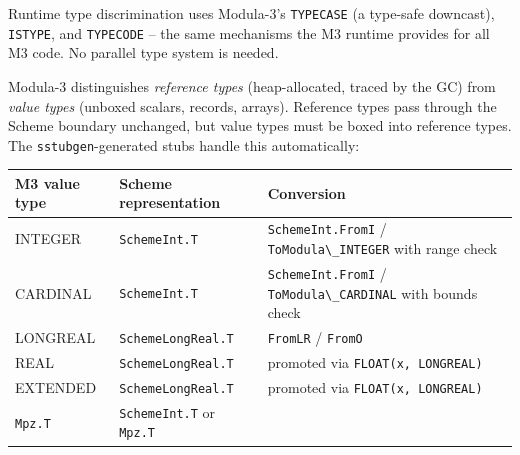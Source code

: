 \documentclass[
  12pt,
]{report}
\newcommand{\passthrough}[1]{#1}
\newcounter{none} %
\begin{document}
Runtime type discrimination uses Modula-3's
\passthrough{\lstinline!TYPECASE!} (a type-safe downcast),
\passthrough{\lstinline!ISTYPE!}, and \passthrough{\lstinline!TYPECODE!}
-- the same mechanisms the M3 runtime provides for all M3 code. No
parallel type system is needed.

Modula-3 distinguishes \emph{reference types} (heap-allocated, traced by
the GC) from \emph{value types} (unboxed scalars, records, arrays).
Reference types pass through the Scheme boundary unchanged, but value
types must be boxed into reference types. The
\passthrough{\lstinline!sstubgen!}-generated stubs handle this
automatically:

{\def\LTcaptype{none} %
\begin{longtable}[]{@{}
  >{\raggedright\arraybackslash}p{}
  >{\raggedright\arraybackslash}p{}
  >{\raggedright\arraybackslash}p{}@{}}
\toprule\noalign{}
\begin{minipage}[b]{\linewidth}\raggedright
M3 value type
\end{minipage} & \begin{minipage}[b]{\linewidth}\raggedright
Scheme representation
\end{minipage} & \begin{minipage}[b]{\linewidth}\raggedright
Conversion
\end{minipage} \\
\midrule\noalign{}
\endhead
\bottomrule\noalign{}
\endlastfoot
INTEGER & \passthrough{\lstinline!SchemeInt.T!} &
\passthrough{\lstinline!SchemeInt.FromI!} / \passthrough{\lstinline!ToModula\_INTEGER!} with range check \\
CARDINAL & \passthrough{\lstinline!SchemeInt.T!} &
\passthrough{\lstinline!SchemeInt.FromI!} / \passthrough{\lstinline!ToModula\_CARDINAL!} with bounds check \\
LONGREAL & \passthrough{\lstinline!SchemeLongReal.T!} &
\passthrough{\lstinline!FromLR!} / \passthrough{\lstinline!FromO!} \\
REAL & \passthrough{\lstinline!SchemeLongReal.T!} &
promoted via \passthrough{\lstinline!FLOAT(x, LONGREAL)!} \\
EXTENDED & \passthrough{\lstinline!SchemeLongReal.T!} &
promoted via \passthrough{\lstinline!FLOAT(x, LONGREAL)!} \\
\passthrough{\lstinline!Mpz.T!} & \passthrough{\lstinline!SchemeInt.T!} or \passthrough{\lstinline!Mpz.T!} &

\end{longtable}}
\end{document}
